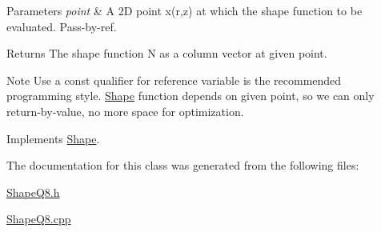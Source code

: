 \begin{DoxyParams}{Parameters}
{\em point} & A 2D point x(r,z) at which the shape function to be evaluated. Pass-\/by-\/ref. \\
\hline
\end{DoxyParams}
\begin{DoxyReturn}{Returns}
The shape function N as a column vector at given point.
\end{DoxyReturn}
\begin{DoxyNote}{Note}
Use a const qualifier for reference variable is the recommended programming style. \mbox{\hyperlink{class_shape}{Shape}} function depends on given point, so we can only return-\/by-\/value, no more space for optimization. 
\end{DoxyNote}


Implements \mbox{\hyperlink{class_shape_a0e0400bca54c29b5097c84ace51ecc7b}{Shape}}.



The documentation for this class was generated from the following files\+:\begin{DoxyCompactItemize}
\item 
\mbox{\hyperlink{_shape_q8_8h}{Shape\+Q8.\+h}}\item 
\mbox{\hyperlink{_shape_q8_8cpp}{Shape\+Q8.\+cpp}}\end{DoxyCompactItemize}
